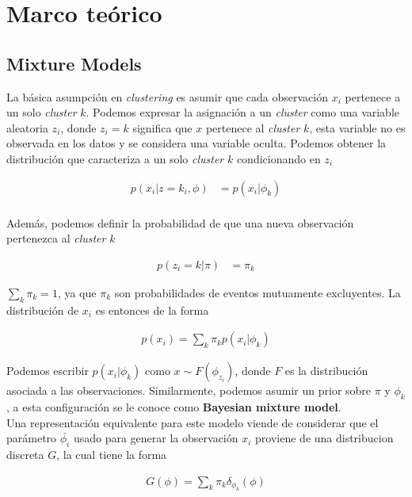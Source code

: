 \documentclass[letterpaper,12pt,oneside]{book} %
\begin{document}
\chapter{Marco teórico}
\section{Mixture Models}


La básica asumpción en \textit{clustering} es asumir que cada observación $x_{i}$ pertenece a un solo \textit{cluster} $k$. Podemos expresar la asignación a un \textit{cluster} como una variable aleatoria $z_{i}$, donde $z_{i}=k$ significa que $x$ pertenece al \textit{cluster} $k$, esta variable no es observada en los datos y se considera una variable oculta. Podemos obtener la distribución que caracteriza a un solo \textit{cluster} $k$ condicionando en $z_{i}$

\begin{align}
    p(x_{i}|z=k_{i}, \phi) & = p(x_{i}|\phi_{k})\\
\end{align}

Además, podemos definir la probabilidad de que una nueva observación pertenezca al \textit{cluster} $k$ 

\begin{align}
    p(z_{i}=k|\pi) & = \pi_{k}
\end{align}

$\sum_{k}\pi_{k} = 1$, ya que $\pi_{k}$ son probabilidades de eventos mutuamente excluyentes. La distribución de $x_{i}$ es entonces de la forma

\begin{align}
    p(x_{i}) = \sum_{k}\pi_{k}p(x_{i}|\phi_{k})
\end{align}

Podemos escribir $p(x_{i}|\phi_{k})$ como $x \sim F(\phi_{z_{i}})$, donde $F$ es la distribución asociada a las observaciones. Similarmente, podemos asumir un prior sobre $\pi$ y $\phi_{k}$, a esta configuración se le conoce como \textbf{Bayesian mixture model}.\\

Una representación equivalente para este modelo viende de considerar que el parámetro $\bar{\phi_{i}}$ usado para generar la observación $x_{i}$ proviene de una distribucion discreta $G$, la cual tiene la forma

\begin{align}
    G(\phi) = \sum_{k} \pi_{k}\delta_{\phi_{k}}(\phi)
\end{align}
\end{document}
